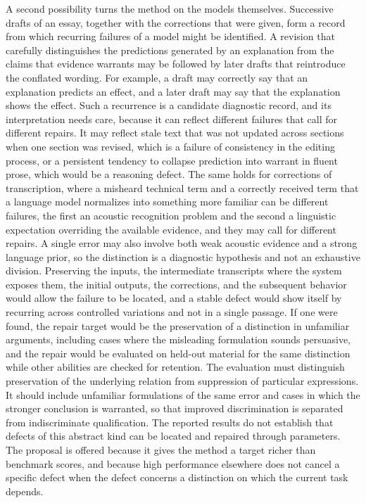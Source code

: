 \documentclass[11pt]{article}
\begin{document}
A second possibility turns the method on the models themselves. Successive drafts of an essay, together with the corrections that were given, form a record from which recurring failures of a model might be identified. A revision that carefully distinguishes the predictions generated by an explanation from the claims that evidence warrants may be followed by later drafts that reintroduce the conflated wording. For example, a draft may correctly say that an explanation predicts an effect, and a later draft may say that the explanation shows the effect. Such a recurrence is a candidate diagnostic record, and its interpretation needs care, because it can reflect different failures that call for different repairs. It may reflect stale text that was not updated across sections when one section was revised, which is a failure of consistency in the editing process, or a persistent tendency to collapse prediction into warrant in fluent prose, which would be a reasoning defect. The same holds for corrections of transcription, where a misheard technical term and a correctly received term that a language model normalizes into something more familiar can be different failures, the first an acoustic recognition problem and the second a linguistic expectation overriding the available evidence, and they may call for different repairs. A single error may also involve both weak acoustic evidence and a strong language prior, so the distinction is a diagnostic hypothesis and not an exhaustive division. Preserving the inputs, the intermediate transcripts where the system exposes them, the initial outputs, the corrections, and the subsequent behavior would allow the failure to be located, and a stable defect would show itself by recurring across controlled variations and not in a single passage. If one were found, the repair target would be the preservation of a distinction in unfamiliar arguments, including cases where the misleading formulation sounds persuasive, and the repair would be evaluated on held-out material for the same distinction while other abilities are checked for retention. The evaluation must distinguish preservation of the underlying relation from suppression of particular expressions. It should include unfamiliar formulations of the same error and cases in which the stronger conclusion is warranted, so that improved discrimination is separated from indiscriminate qualification. The reported results do not establish that defects of this abstract kind can be located and repaired through parameters. The proposal is offered because it gives the method a target richer than benchmark scores, and because high performance elsewhere does not cancel a specific defect when the defect concerns a distinction on which the current task depends.
\end{document}
